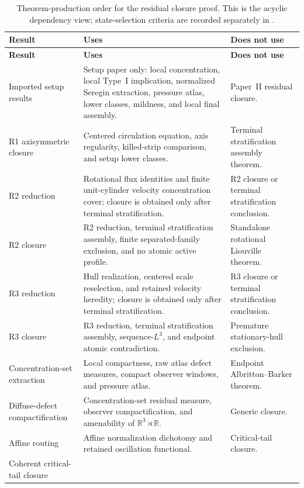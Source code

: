 \documentclass[11pt]{amsart}
\numberwithin{equation}{section}
\theoremstyle{plain}
\theoremstyle{definition}
\theoremstyle{remark}
\begin{document}
\begin{longtable}{@{}L{0.24\textwidth}L{0.45\textwidth}L{0.23\textwidth}@{}}
\caption{Theorem-production order for the residual closure proof.  This is the
acyclic dependency view; state-selection criteria are recorded separately in
.}
\label{tab:typeI-dependency-order}\\
\hline
\textbf{Result} & \textbf{Uses} & \textbf{Does not use}\\
\hline
\endfirsthead
\hline
\textbf{Result} & \textbf{Uses} & \textbf{Does not use}\\
\hline
\endhead
\hline
\endfoot
Imported setup results &
Setup paper only: local concentration, local Type~I implication, normalized
Seregin extraction, pressure atlas, lower classes, mildness, and local final
assembly. &
Paper~II residual closure.\\
R1 axisymmetric closure &
Centered circulation equation, axis regularity, killed-strip comparison, and
setup lower classes. &
Terminal stratification assembly theorem.\\
R2 reduction &
Rotational flux identities and finite unit-cylinder velocity concentration
cover; closure is obtained only after terminal stratification. &
R2 closure or terminal stratification conclusion.\\
R2 closure &
R2 reduction, terminal stratification assembly, finite separated-family exclusion,
and no atomic active profile. &
Standalone rotational Liouville theorem.\\
R3 reduction &
Hull realization, centered scale reselection, and retained velocity heredity;
closure is obtained only after terminal stratification. &
R3 closure or terminal stratification conclusion.\\
R3 closure &
R3 reduction, terminal stratification assembly, sequence-\(L^3\), and endpoint
atomic contradiction. &
Premature stationary-hull exclusion.\\
Concentration-set extraction &
Local compactness, raw atlas defect measures, compact observer windows, and pressure
atlas. &
Endpoint Albritton--Barker theorem.\\
Diffuse-defect compactification &
Concentration-set residual measure, observer compactification, and amenability of
\(\mathbb R^3\rtimes\mathbb R\). &
Generic closure.\\
Affine routing &
Affine normalization dichotomy and retained oscillation functional. &
Critical-tail closure.\\
Coherent critical-tail closure &

\end{longtable}
\end{document}
